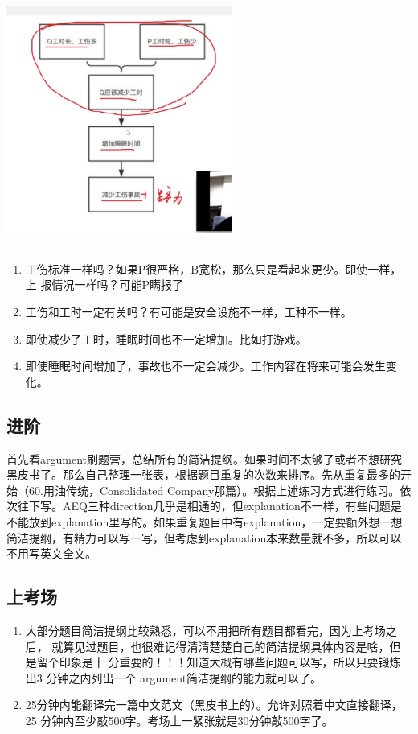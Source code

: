 \documentclass[cn,plain]{./src/qyxfbook}
\begin{document}
\begin{center}
\includegraphics[width=2.925in,height=3.28443in]{illus1.jpg}
\end{center}

\begin{enumerate}
    \item 工伤标准一样吗？如果P很严格，B宽松，那么只是看起来更少。即使一样，上
    报情况一样吗？可能P瞒报了
    \item 工伤和工时一定有关吗？有可能是安全设施不一样，工种不一样。
    \item 即使减少了工时，睡眠时间也不一定增加。比如打游戏。
    \item 即使睡眠时间增加了，事故也不一定会减少。工作内容在将来可能会发生变化。
\end{enumerate}

\subsection{进阶}
首先看argument刷题营，总结所有的简洁提纲。如果时间不太够了或者不想研究黑皮书了。那么自己整理一张表，根据题目重复的次数来排序。先从重复最多的开始（60.用油传统，Consolidated
Company那篇）。根据上述练习方式进行练习。依次往下写。AEQ三种direction几乎是相通的，但explanation不一样，有些问题是不能放到explanation里写的。如果重复题目中有explanation，一定要额外想一想简洁提纲，有精力可以写一写，但考虑到explanation本来数量就不多，所以可以不用写英文全文。

\subsection{上考场}
\begin{enumerate}
    \item 大部分题目简洁提纲比较熟悉，可以不用把所有题目都看完，因为上考场之后，
    就算见过题目，也很难记得清清楚楚自己的简洁提纲具体内容是啥，但是留个印象是十
    分重要的！！！知道大概有哪些问题可以写，所以只要锻炼出3 分钟之内列出一个
    argument简洁提纲的能力就可以了。
    \item 25分钟内能翻译完一篇中文范文（黑皮书上的）。允许对照着中文直接翻译，25
    分钟内至少敲500字。考场上一紧张就是30分钟敲500字了。
\end{enumerate}
\end{document}
